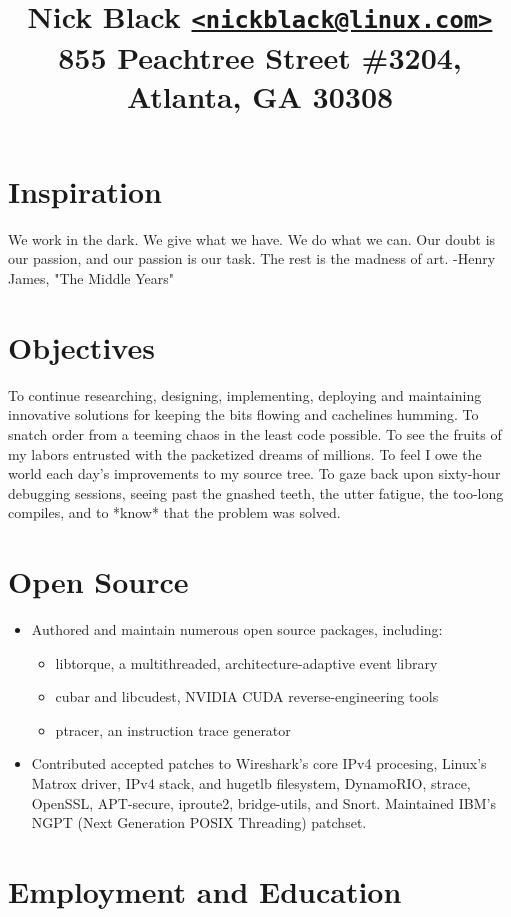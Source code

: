 \documentclass{article}
\author{}
\title{
\bf\Large{Nick Black \href{mailto:nickblack@linux.com}{\nolinkurl{<nickblack@linux.com>}}}\\
\bf\Large{855 Peachtree Street \#3204, Atlanta, GA 30308}
}
\date{}
\newenvironment{tightitemize}
{\begin{itemize}
  \setlength{\itemsep}{1pt}
  \setlength{\parskip}{0pt}
  \setlength{\parsep}{0pt}}
{\end{itemize}}
\begin{document}
\maketitle
\section{Inspiration}

We work in the dark. We give what we have. We do what we can.
Our doubt is our passion, and our passion is our task.
The rest is the madness of art. -Henry James, "The Middle Years"

\section{Objectives}

To continue researching, designing, implementing, deploying and maintaining
innovative solutions for keeping the bits flowing and cachelines humming.
To snatch order from a teeming chaos in the least code possible. To see the
fruits of my labors entrusted with the packetized dreams of millions. To feel I
owe the world each day's improvements to my source tree. To gaze back upon
sixty-hour debugging sessions, seeing past the gnashed teeth, the utter
fatigue, the too-long compiles, and to *know* that the problem was solved.

\section{Open Source}
\begin{tightitemize}
\item Authored and maintain numerous open source packages, including:
\begin{tightitemize}
\item libtorque, a multithreaded, architecture-adaptive event library
\item cubar and libcudest, NVIDIA CUDA reverse-engineering tools
\item ptracer, an instruction trace generator
\end{tightitemize}
\item Contributed accepted patches to Wireshark's core IPv4 procesing, Linux's
  Matrox driver, IPv4 stack, and hugetlb filesystem, DynamoRIO,
  strace, OpenSSL, APT-secure, iproute2, bridge-utils, and Snort.
  Maintained IBM's NGPT (Next Generation POSIX Threading) patchset.
\end{tightitemize}

\section{Employment and Education}
\end{document}
